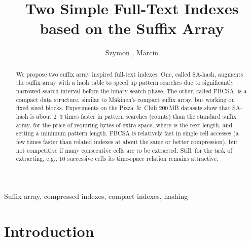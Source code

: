 \documentclass{cai}
\begin{document}
\label{firstpage}

\title[Two simple full-text indexes based on the suffix array]
      {Two Simple Full-Text Indexes\\ based on the Suffix Array}

\author[Sz.~Grabowski, M.~Raniszewski]
       {Szymon , Marcin }





\noreceived{} \nocommunicated{}

\maketitle

\begin{abstract}
We propose two suffix array inspired full-text indexes.
One, called SA-hash, augments the suffix array with a hash table 
to speed up pattern searches due to significantly narrowed search 
interval before the binary search phase.
The other, called FBCSA, is a compact data structure, similar to
M{\"a}kinen's compact suffix array, but working on fixed sized blocks.
Experiments 
on the Pizza~\&~Chili 200\,MB datasets 
show that SA-hash is about 2--3 times faster in pattern searches (counts) 
than the standard suffix array, for the price of requiring  
bytes of extra space, where  is the text length, and setting a 
minimum pattern length.
FBCSA is relatively fast in single cell accesses (a few times faster 
than related indexes at about the same or better compression), 
but not competitive if many consecutive cells are to be extracted. 
Still, for the task of extracting, e.g., 10 successive cells its time-space 
relation remains attractive.
\end{abstract}

\begin{keywords}
Suffix array, compressed indexes, compact indexes, hashing
\end{keywords}



\section{Introduction}
\end{document}
